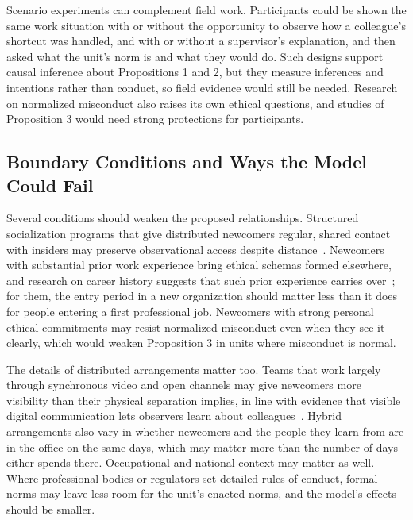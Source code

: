 Scenario experiments can complement field work. Participants could be shown the same work situation with or without the opportunity to observe how a colleague's shortcut was handled, and with or without a supervisor's explanation, and then asked what the unit's norm is and what they would do. Such designs support causal inference about Propositions 1 and 2, but they measure inferences and intentions rather than conduct, so field evidence would still be needed. Research on normalized misconduct also raises its own ethical questions, and studies of Proposition 3 would need strong protections for participants.

\subsection{Boundary Conditions and Ways the Model Could Fail}

Several conditions should weaken the proposed relationships. Structured socialization programs that give distributed newcomers regular, shared contact with insiders may preserve observational access despite distance~\citep{ashforth1996socialization}. Newcomers with substantial prior work experience bring ethical schemas formed elsewhere, and research on career history suggests that such prior experience carries over~\citep{dokko2009unpacking,higgins2005career}; for them, the entry period in a new organization should matter less than it does for people entering a first professional job. Newcomers with strong personal ethical commitments may resist normalized misconduct even when they see it clearly, which would weaken Proposition 3 in units where misconduct is normal.

The details of distributed arrangements matter too. Teams that work largely through synchronous video and open channels may give newcomers more visibility than their physical separation implies, in line with evidence that visible digital communication lets observers learn about colleagues~\citep{leonardi2015ambient}. Hybrid arrangements also vary in whether newcomers and the people they learn from are in the office on the same days, which may matter more than the number of days either spends there. Occupational and national context may matter as well. Where professional bodies or regulators set detailed rules of conduct, formal norms may leave less room for the unit's enacted norms, and the model's effects should be smaller.


